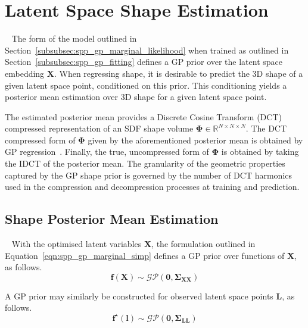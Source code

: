 \section{Latent Space Shape Estimation}
~\label{sec:spp_latent_shape_est}
The form of the model outlined in Section~\ref{subsubsec:spp_gp_marginal_likelihood}
when trained as outlined in Section~\ref{subsubsec:spp_gp_fitting} defines a GP prior 
over the latent space embedding \( \bm{X} \). When regressing shape, it is desirable to 
predict the 3D shape of a given latent space point, conditioned on this prior. This 
conditioning yields a posterior mean estimation over 3D shape for a given latent space point.

The estimated posterior mean provides a Discrete Cosine Transform (DCT) compressed representation 
of an SDF shape volume \( \bm{\Phi} \in \mathbb{R}^{N \times N \times N} \). The DCT compressed form 
of \( \bm{\Phi} \) given by the aforementioned posterior mean is obtained by GP regression~\cite{GPML}. 
Finally, the true, uncompressed form of \( \bm{\Phi} \) is obtained by taking the IDCT of the posterior mean. 
The granularity of the geometric properties captured by the GP shape prior is governed by the number of DCT 
harmonics used in the compression and decompression processes at training and prediction.

\subsection{Shape Posterior Mean Estimation}
~\label{subsec:spp_pos_mean_est}
With the optimised latent variables \( \bm{X} \), the formulation outlined in 
Equation~\ref{eqn:spp_gp_marginal_simp} defines a GP prior 
over functions of \( \bm{X} \), as follows.
\begin{equation}
  \label{eqn:gp_prior}
  \bm{f}(\bm{X}) \sim \mathcal{GP}(\bm{0}, \bm{\Sigma}_{\bm{XX}})
\end{equation}

A GP prior may similarly be constructed for observed latent 
space points \( \bm{L} \), as follows.
\begin{equation}
  \label{eqn:gp_prior_latent}
  \bm{f}^{\star}(\bm{l}) \sim \mathcal{GP}(\bm{0}, \bm{\Sigma}_{\bm{LL}})
\end{equation}

